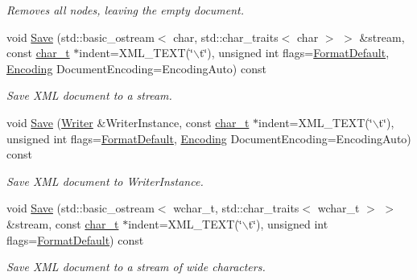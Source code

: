 \begin{DoxyCompactItemize}
\begin{DoxyCompactList}\small\item\em Removes all nodes, leaving the empty document. \item\end{DoxyCompactList}\item 
void \hyperlink{classphys_1_1xml_1_1Document_aa9f44d46ec6139680ebde26122cc6281}{Save} (std::basic\_\-ostream$<$ char, std::char\_\-traits$<$ char $>$ $>$ \&stream, const \hyperlink{namespacephys_1_1xml_afc87705cd1c2917d87b879715a2d8f6e}{char\_\-t} $\ast$indent=XML\_\-TEXT(\char`\"{}$\backslash$t\char`\"{}), unsigned int flags=\hyperlink{namespacephys_1_1xml_a08bf6aab51f79929d9097706a5e64408}{FormatDefault}, \hyperlink{namespacephys_1_1xml_a420f5de782438f88160321385bea2015}{Encoding} DocumentEncoding=EncodingAuto) const 
\begin{DoxyCompactList}\small\item\em Save XML document to a stream. \item\end{DoxyCompactList}\item 
void \hyperlink{classphys_1_1xml_1_1Document_a6aacc12d692e13976c568ed50186b85d}{Save} (\hyperlink{classphys_1_1xml_1_1Writer}{Writer} \&WriterInstance, const \hyperlink{namespacephys_1_1xml_afc87705cd1c2917d87b879715a2d8f6e}{char\_\-t} $\ast$indent=XML\_\-TEXT(\char`\"{}$\backslash$t\char`\"{}), unsigned int flags=\hyperlink{namespacephys_1_1xml_a08bf6aab51f79929d9097706a5e64408}{FormatDefault}, \hyperlink{namespacephys_1_1xml_a420f5de782438f88160321385bea2015}{Encoding} DocumentEncoding=EncodingAuto) const 
\begin{DoxyCompactList}\small\item\em Save XML document to WriterInstance. \item\end{DoxyCompactList}\item 
void \hyperlink{classphys_1_1xml_1_1Document_a034a5497b68d8531886fdc7a6a67bd7d}{Save} (std::basic\_\-ostream$<$ wchar\_\-t, std::char\_\-traits$<$ wchar\_\-t $>$ $>$ \&stream, const \hyperlink{namespacephys_1_1xml_afc87705cd1c2917d87b879715a2d8f6e}{char\_\-t} $\ast$indent=XML\_\-TEXT(\char`\"{}$\backslash$t\char`\"{}), unsigned int flags=\hyperlink{namespacephys_1_1xml_a08bf6aab51f79929d9097706a5e64408}{FormatDefault}) const 
\begin{DoxyCompactList}\small\item\em Save XML document to a stream of wide characters. \item\end{DoxyCompactList}\item 

\end{DoxyCompactItemize}
